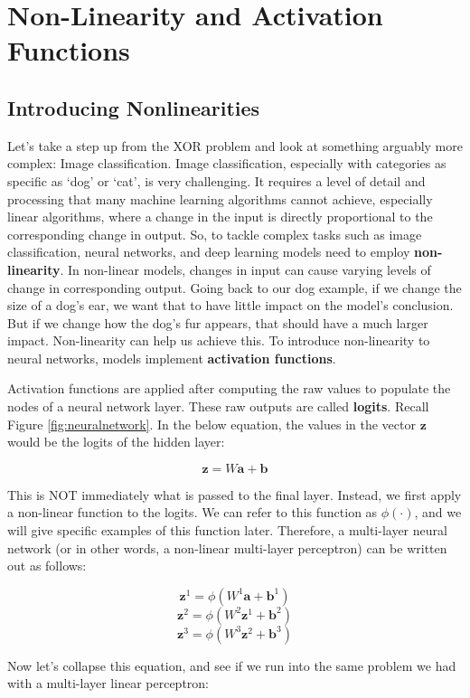 \section{Non-Linearity and Activation Functions}
\subsection{Introducing Nonlinearities}
    \large Let's take a step up from the XOR problem and look at something arguably more complex: Image classification. Image classification, especially with categories as specific as `dog' or `cat', is very challenging. It requires a level of detail and processing that many machine learning algorithms cannot achieve, especially linear algorithms, where a change in the input is directly proportional to the corresponding change in output. So, to tackle complex tasks such as image classification, neural networks, and deep learning models need to employ \textbf{non-linearity}. In non-linear models, changes in input can cause varying levels of change in corresponding output. Going back to our dog example, if we change the size of a dog's ear, we want that to have little impact on the model's conclusion. But if we change how the dog's fur appears, that should have a much larger impact. Non-linearity can help us achieve this. To introduce non-linearity to neural networks, models implement \textbf{activation functions}. 
    
    Activation functions are applied after computing the raw values to populate the nodes of a neural network layer. These raw outputs are called \textbf{logits}. Recall Figure \ref{fig:neuralnetwork}. In the below equation, the values in the vector $\textbf{z}$ would be the logits of the hidden layer:

    $$\textbf{z} = W\textbf{a} + \textbf{b}$$

    This is NOT immediately what is passed to the final layer. Instead, we first apply a non-linear function to the logits. We can refer to this function as $\phi(\cdot)$, and we will give specific examples of this function later. Therefore, a multi-layer neural network (or in other words, a non-linear multi-layer perceptron) can be written out as follows:

    $$\textbf{z}^1 = \phi(W^1\textbf{a} + \textbf{b}^1)$$
    $$\textbf{z}^2 = \phi(W^2\textbf{z}^1 + \textbf{b}^2)$$
    $$\textbf{z}^3 = \phi(W^3\textbf{z}^2 + \textbf{b}^3)$$

    Now let's collapse this equation, and see if we run into the same problem we had with a multi-layer linear perceptron:


